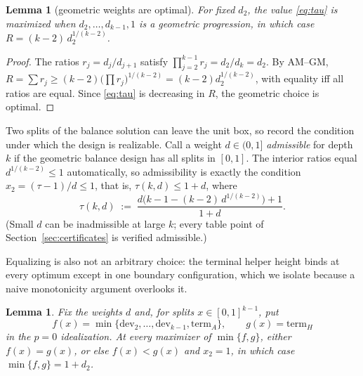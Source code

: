 \documentclass[11pt]{article}
\newtheorem{lemma}[theorem]{Lemma}
\theoremstyle{definition}
\begin{document}
\begin{lemma}[geometric weights are optimal]\label{lem:amgm}
For fixed $d_2$, the value \eqref{eq:tau} is maximized when
$d_2,\ldots,d_{k-1},1$ is a geometric progression, in which case
$R=(k-2)\,d_2^{1/(k-2)}$.
\end{lemma}

\begin{proof}
The ratios $r_j=d_j/d_{j+1}$ satisfy $\prod_{j=2}^{k-1}r_j=d_2/d_k=d_2$.
By AM--GM, $R=\sum r_j\ge(k-2)\bigl(\prod r_j\bigr)^{1/(k-2)}
=(k-2)d_2^{1/(k-2)}$, with equality iff all ratios are equal.  Since
\eqref{eq:tau} is decreasing in $R$, the geometric choice is optimal.
\end{proof}

Two splits of the balance solution can leave the unit box, so record the
condition under which the design is realizable.  Call a weight
$d\in(0,1]$ \emph{admissible} for depth $k$ if the geometric balance
design has all splits in $[0,1]$.  The interior ratios equal
$d^{1/(k-2)}\le1$ automatically, so admissibility is exactly the condition
$x_2=(\tau-1)/d\le1$, that is, $\tau(k,d)\le1+d$, where
\[
 \tau(k,d)\;:=\;\frac{d\bigl(k-1-(k-2)\,d^{1/(k-2)}\bigr)+1}{1+d}.
\]
(Small $d$ can be inadmissible at large $k$; every table point of
Section~\ref{sec:certificates} is verified admissible.)

Equalizing is also not an arbitrary choice: the terminal helper height
binds at every optimum except in one boundary configuration, which we
isolate because a naive monotonicity argument overlooks it.

\begin{lemma}\label{lem:tight}
Fix the weights $d$ and, for splits $x\in[0,1]^{k-1}$, put
\[
 f(x)=\min\{\mathrm{dev}_2,\ldots,\mathrm{dev}_{k-1},\mathrm{term}_A\},
 \qquad
 g(x)=\mathrm{term}_H
\]
in the $p=0$ idealization.  At every maximizer of
$\min\{f,g\}$, either $f(x)=g(x)$, or else $f(x)<g(x)$ and $x_2=1$, in
which case $\min\{f,g\}=1+d_2$.
\end{lemma}
\end{document}
